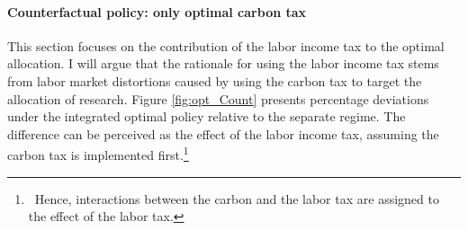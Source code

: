 \begin{figure}[h!!!]
\begin{subfigure}{0.4\textwidth}
	\end{subfigure}
\end{figure}
\paragraph{Counterfactual policy: only optimal carbon tax}
This section focuses on the contribution of the labor income tax to the optimal allocation.
I will argue that the rationale for using the labor income tax stems 
from labor market distortions caused by using the carbon tax to target the allocation of research. 
Figure \ref{fig:opt_Count} presents percentage deviations under the integrated optimal policy relative to the separate regime. The difference can be perceived as the effect of the labor income tax, assuming the carbon tax is implemented first.\footnote{\ Hence, interactions between the carbon and the labor tax are assigned to the effect of the labor tax.}

